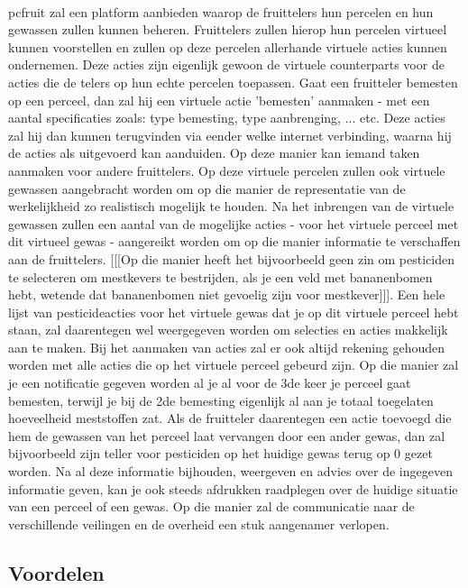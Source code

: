 \paragraph {} pcfruit zal een platform aanbieden waarop de fruittelers hun percelen en hun
gewassen zullen kunnen beheren. Fruittelers zullen hierop hun percelen virtueel kunnen
voorstellen en zullen op deze percelen allerhande virtuele acties kunnen ondernemen. Deze
acties zijn eigenlijk gewoon de virtuele counterparts voor de acties die de telers op hun
echte percelen toepassen. Gaat een fruitteler bemesten op een perceel, dan zal hij een
virtuele actie 'bemesten' aanmaken - met een aantal specificaties zoals: type bemesting,
type aanbrenging, ... etc. Deze acties zal hij dan kunnen terugvinden via eender welke
internet verbinding, waarna hij de acties als uitgevoerd kan aanduiden. Op deze manier kan
iemand taken aanmaken voor andere fruittelers. Op deze virtuele percelen zullen ook
virtuele gewassen aangebracht worden om op die manier de representatie van de
werkelijkheid zo realistisch mogelijk te houden. Na het inbrengen van de virtuele gewassen
zullen een aantal van de mogelijke acties - voor het virtuele perceel met dit virtueel
gewas - aangereikt worden om op die manier informatie te verschaffen aan de fruittelers.
[[[Op die manier heeft het bijvoorbeeld geen zin om pesticiden te selecteren om mestkevers
te bestrijden, als je een veld met bananenbomen hebt, wetende dat bananenbomen niet
gevoelig zijn voor mestkever]]]. Een hele lijst van pesticideacties voor het virtuele
gewas dat je op dit virtuele perceel hebt staan, zal daarentegen wel weergegeven worden om
selecties en acties makkelijk aan te maken. Bij het aanmaken van acties zal er ook altijd
rekening gehouden worden met alle acties die op het virtuele perceel gebeurd zijn. Op die
manier zal je een notificatie gegeven worden al je al voor de 3de keer je perceel gaat
bemesten, terwijl je bij de 2de bemesting eigenlijk al aan je totaal toegelaten
hoeveelheid meststoffen zat. Als de fruitteler daarentegen een actie toevoegd die hem de
gewassen van het perceel laat vervangen door een ander gewas, dan zal bijvoorbeeld zijn
teller voor pesticiden op het huidige gewas terug op 0 gezet worden. Na al deze informatie
bijhouden, weergeven en advies over de ingegeven informatie geven, kan je ook steeds
afdrukken raadplegen over de huidige situatie van een perceel of een gewas. Op die manier
zal de communicatie naar de verschillende veilingen en de overheid een stuk aangenamer
verlopen.


\subsection {Voordelen}

